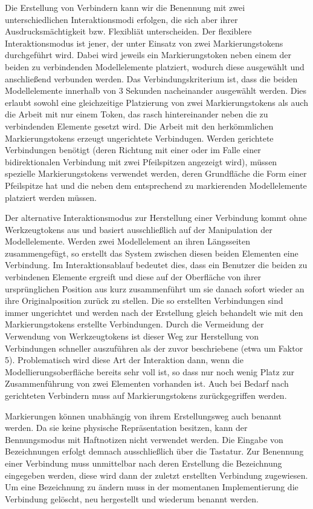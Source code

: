 Die Erstellung von Verbindern kann wir die Benennung mit zwei unterschiedlichen Interaktionsmodi erfolgen, die sich aber ihrer Ausdrucksmächtigkeit bzw. Flexibliät unterscheiden. Der flexiblere Interaktionsmodus ist jener, der unter Einsatz von zwei Markierungstokens durchgeführt wird. Dabei wird jeweils ein Markierungstoken neben einem der beiden zu verbindenden Modellelemente platziert, wodurch diese ausgewählt und anschließend verbunden werden. Das Verbindungskriterium ist, dass die beiden Modellelemente innerhalb von 3 Sekunden nacheinander ausgewählt werden. Dies erlaubt sowohl eine gleichzeitige Platzierung von zwei Markierungstokens als auch die Arbeit mit nur einem Token, das rasch hintereinander neben die zu verbindenden Elemente gesetzt wird. Die Arbeit mit den herkömmlichen Markierungstokens erzeugt ungerichtete Verbindugen. Werden gerichtete Verbindungen benötigt (deren Richtung mit einer oder im Falle einer bidirektionalen Verbindung mit zwei Pfeilspitzen angezeigt wird), müssen spezielle Markierungstokens verwendet werden, deren Grundfläche die Form einer Pfeilspitze hat und die neben dem entsprechend zu markierenden Modellelemente platziert werden müssen.

Der alternative Interaktionsmodus zur Herstellung einer Verbindung kommt ohne Werkzeugtokens aus und basiert ausschließlich auf der Manipulation der Modellelemente. Werden zwei Modellelement an ihren Längsseiten zusammengefügt, so erstellt das System zwischen diesen beiden Elementen eine Verbindung. Im Interaktionsablauf bedeutet dies, dass ein Benutzer die beiden zu verbindenen Elemente ergreift und diese auf der Oberfläche von ihrer ursprünglichen Position aus kurz zusammenführt um sie danach sofort wieder an ihre Originalposition zurück zu stellen. Die so erstellten Verbindungen sind immer ungerichtet und werden nach der Erstellung gleich behandelt wie mit den Markierungstokens erstellte Verbindungen. Durch die Vermeidung der Verwendung von Werkzeugtokens ist dieser Weg zur Herstellung von Verbindungen schneller auszuführen als der zuvor beschriebene (etwa um Faktor 5). Problematisch wird diese Art der Interaktion dann, wenn die Modellierungsoberfläche bereits sehr voll ist, so dass nur noch wenig Platz zur Zusammenführung von zwei Elementen vorhanden ist. Auch bei Bedarf nach gerichteten Verbindern muss auf Markierungstokens zurückgegriffen werden.

Markierungen können unabhängig von ihrem Erstellungsweg auch benannt werden. Da sie keine physische Repräsentation besitzen, kann der Bennungsmodus mit Haftnotizen nicht verwendet werden. Die Eingabe von Bezeichnungen erfolgt demnach ausschließlich über die Tastatur. Zur Benennung einer Verbindung muss unmittelbar nach deren Erstellung die Bezeichnung eingegeben werden, diese wird dann der zuletzt erstellten Verbindung zugewiesen. Um eine Bezeichnung zu ändern muss in der momentanen Implementierung die Verbindung gelöscht, neu hergestellt und wiederum benannt werden.

